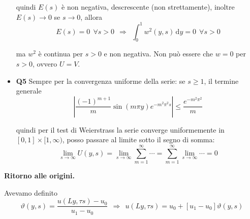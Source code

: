 \documentclass[10pt,a4paper,twoside,openright]{book}
\newcommand{\de}{\,\mathrm d}
\newcommand{\dy}{\de y}
\begin{document}
\begin{itemize}
quindi $E(s)$ è non negativa, descrescente (non strettamente), inoltre $E(s)\rightarrow 0$ se $s\rightarrow 0$, allora
\begin{equation*}
    E(s) =0\ \ \forall s >0\ \ \Rightarrow \ \ \int ^{1}_{0} w^{2}(y,s) \dy=0\ \ \forall s >0
\end{equation*}

ma $w^{2}$ è continua per $s >0$ e non negativa. Non può essere che $w=0$ per $s >0$, ovvero $U=V$.
\item \textbf{Q5} Sempre per la convergenza uniforme della serie: se $\displaystyle s\geqslant 1$, il termine generale \begin{equation*}
    \left| \frac{(-1)^{m+1}}{m}\sin(m\pi y) e^{-m^{2} \pi ^{2} s}\right| \leqslant \frac{e^{-m^{2} \pi ^{2}}}{m}
\end{equation*}

quindi per il test di Weierstrass la serie converge uniformemente in $\displaystyle [ 0,1] \times [ 1,\infty)$, posso passare al limite sotto il segno di somma:
\begin{equation*}
    \lim_{s \to \infty} U(y,s) = \lim_{s \to \infty} \sum\limits ^{\infty }_{m=1}\cdots = \sum\limits ^{\infty }_{m=1} \lim_{s \to \infty} \cdots = 0
\end{equation*}
\end{itemize}

\textbf{Ritorno alle origini.}

Avevamo definito
\begin{equation*}
    \vartheta(y,s) =\frac{u(Ly,\tau s) -u_{0}}{u_{1} -u_{0}} \ \ \Rightarrow \ \ u(Ly,\tau s) =u_{0} +[ u_{1} -u_{0}] \vartheta(y,s)
\end{equation*}
\end{document}
